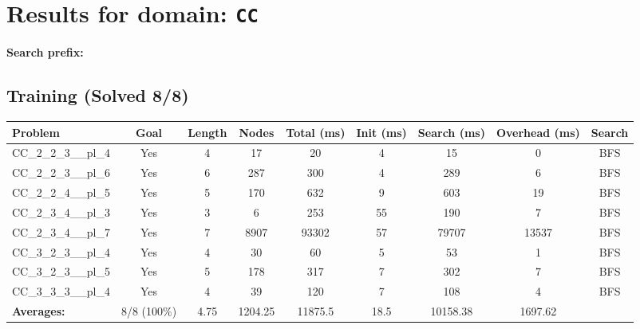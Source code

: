 \documentclass{article}
\begin{document}
\section*{Results for domain: \texttt{CC}}
\textbf{Search prefix:} 
\\[0.5cm]
\subsection*{Training (Solved 8/8)}
\begin{tabular}{lcccccccc}
\toprule
Problem & Goal & Length & Nodes & Total (ms) & Init (ms) & Search (ms) & Overhead (ms) & Search \\
\midrule
CC\_2\_2\_3\_\_pl\_4 & Yes & 4 & 17 & 20 & 4 & 15 & 0 & BFS \\
CC\_2\_2\_3\_\_pl\_6 & Yes & 6 & 287 & 300 & 4 & 289 & 6 & BFS \\
CC\_2\_2\_4\_\_pl\_5 & Yes & 5 & 170 & 632 & 9 & 603 & 19 & BFS \\
CC\_2\_3\_4\_\_pl\_3 & Yes & 3 & 6 & 253 & 55 & 190 & 7 & BFS \\
CC\_2\_3\_4\_\_pl\_7 & Yes & 7 & 8907 & 93302 & 57 & 79707 & 13537 & BFS \\
CC\_3\_2\_3\_\_pl\_4 & Yes & 4 & 30 & 60 & 5 & 53 & 1 & BFS \\
CC\_3\_2\_3\_\_pl\_5 & Yes & 5 & 178 & 317 & 7 & 302 & 7 & BFS \\
CC\_3\_3\_3\_\_pl\_4 & Yes & 4 & 39 & 120 & 7 & 108 & 4 & BFS \\
\textbf{Averages:} & 8/8 (100\%) & 4.75 & 1204.25 & 11875.5 & 18.5 & 10158.38 & 1697.62 & \\
\bottomrule
\end{tabular}
\\[0.7cm]
\end{document}
